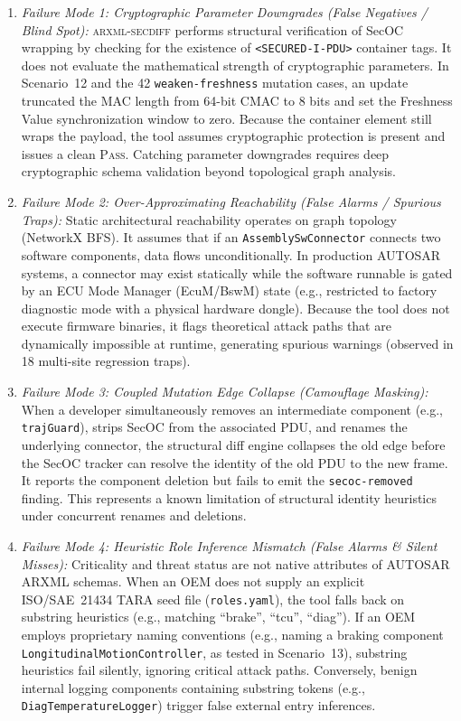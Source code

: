 \documentclass[journal]{IEEEtran}
\begin{document}
\begin{enumerate}
\item \emph{Failure Mode 1: Cryptographic Parameter Downgrades (False Negatives / Blind Spot):}
\textsc{arxml-secdiff} performs structural verification of SecOC wrapping by checking for the existence of \texttt{<SECURED-I-PDU>} container tags. It does not evaluate the mathematical strength of cryptographic parameters. In Scenario~12 and the 42 \texttt{weaken-freshness} mutation cases, an update truncated the MAC length from 64-bit CMAC to 8 bits and set the Freshness Value synchronization window to zero. Because the container element still wraps the payload, the tool assumes cryptographic protection is present and issues a clean \textsc{Pass}. Catching parameter downgrades requires deep cryptographic schema validation beyond topological graph analysis.

\item \emph{Failure Mode 2: Over-Approximating Reachability (False Alarms / Spurious Traps):}
Static architectural reachability operates on graph topology (NetworkX BFS). It assumes that if an \texttt{AssemblySwConnector} connects two software components, data flows unconditionally. In production AUTOSAR systems, a connector may exist statically while the software runnable is gated by an ECU Mode Manager (EcuM/BswM) state (e.g., restricted to factory diagnostic mode with a physical hardware dongle). Because the tool does not execute firmware binaries, it flags theoretical attack paths that are dynamically impossible at runtime, generating spurious warnings (observed in 18 multi-site regression traps).

\item \emph{Failure Mode 3: Coupled Mutation Edge Collapse (Camouflage Masking):}
When a developer simultaneously removes an intermediate component (e.g., \texttt{trajGuard}), strips SecOC from the associated PDU, and renames the underlying connector, the structural diff engine collapses the old edge before the SecOC tracker can resolve the identity of the old PDU to the new frame. It reports the component deletion but fails to emit the \texttt{secoc-removed} finding. This represents a known limitation of structural identity heuristics under concurrent renames and deletions.

\item \emph{Failure Mode 4: Heuristic Role Inference Mismatch (False Alarms \& Silent Misses):}
Criticality and threat status are not native attributes of AUTOSAR ARXML schemas. When an OEM does not supply an explicit ISO/SAE~21434 TARA seed file (\texttt{roles.yaml}), the tool falls back on substring heuristics (e.g., matching ``brake'', ``tcu'', ``diag''). If an OEM employs proprietary naming conventions (e.g., naming a braking component \texttt{LongitudinalMotionController}, as tested in Scenario~13), substring heuristics fail silently, ignoring critical attack paths. Conversely, benign internal logging components containing substring tokens (e.g., \texttt{DiagTemperatureLogger}) trigger false external entry inferences.
\end{enumerate}
\end{document}
